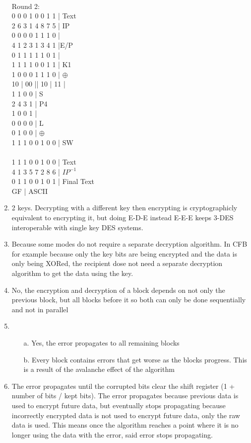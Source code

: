 \documentclass[sigconf]{article}
\begin{document}
\begin{enumerate}
        \\
        Round 2:\\
        0 0 0 1 0 0 1 1 | Text\\
        2 6 3 1 4 8 7 5 | IP\\
        0 0 0 0 1 1 1 0 |\\
        4 1 2 3 1 3 4 1 |E/P\\
        0 1 1 1 1 1 0 1 |\\
        1 1 1 1 0 0 1 1 | K1\\
        1 0 0 0 1 1 1 0 | $\oplus$\\
        10 | 00 || 10 | 11 |\\
        1 1 0 0 | S\\
        2 4 3 1 | P4\\
        1 0 0 1 |\\
        0 0 0 0 | L\\
        0 1 0 0 | $\oplus$\\
        1 1 1 0 0 1 0 0 | SW\\
        \\
        1 1 1 0 0 1 0 0 | Text\\
        4 1 3 5 7 2 8 6 | $IP^{-1}$\\
        0 1 1 0 0 1 0 1 | Final Text\\
        GF | ASCII
            




  \item 2 keys. Decrypting with a different key then encrypting is cryptographicly equivalent to encrypting it, but doing E-D-E instead E-E-E keeps 3-DES interoperable with single key DES systems.
  \item Because some modes do not require a separate decryption algorithm. In CFB for example because only the key bits are being encrypted and the data is only being XORed, the recipient dose not need a separate decryption algorithm to get the data using the key.
  \item No, the encryption and decryption of a block depends on not only the previous block, but all blocks before it so both can only be done sequentially and not in parallel
  \item \begin{itemize}
    \item[a.] Yes, the error propagates to all remaining blocks
    \item[b.] Every block contains errors that get worse as the blocks progress. This is a result of the avalanche effect of the algorithm
  \end{itemize}
  \item The error propagates until the corrupted bits clear the shift register (1 + number of bits / kept bits). The error propagates because previous data is used to encrypt future data, but eventually stops propagating because incorrectly encrypted data is not used to encrypt future data, only the raw data is used. This means once the algorithm reaches a point where it is no longer using the data with the error, said error stops propagating. 
\end{enumerate}




\end{document}
